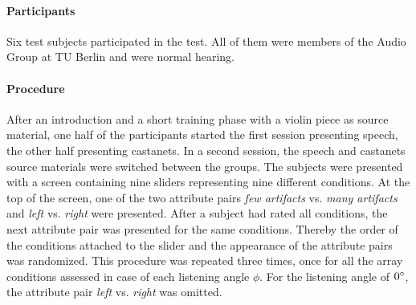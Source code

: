 \paragraph{Participants}
Six test subjects participated in the test. All of them were members of
the Audio Group at {\small TU} Berlin and were normal hearing.


\paragraph{Procedure}
After an introduction and a short training phase with a violin piece as source
material, one half of the participants started the first session
presenting speech, the other half presenting castanets.
In a second session, the speech and castanets source materials were switched
between the groups. The subjects were presented with a screen
containing nine sliders representing nine different conditions.
At the top of the screen, one of the two attribute pairs  \emph{few artifacts}
vs. \emph{many artifacts} and \emph{left} vs. \emph{right} were presented.
After a subject had rated all conditions, the next
attribute pair was presented for the same conditions.
Thereby the order of the
conditions attached to the slider and the appearance of the
attribute pairs was randomized. This procedure was repeated
three times, once for all the array conditions assessed in case of each
listening angle $\phi$.
For the listening angle of $0^\circ$, the attribute pair
\emph{left} vs. \emph{right} was omitted.


